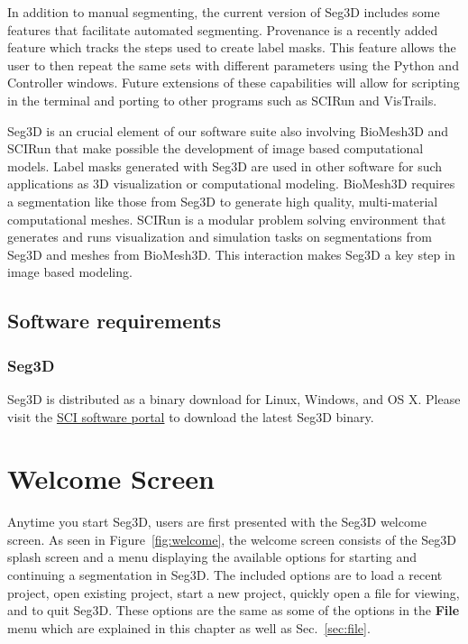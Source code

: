 \documentclass[fleqn,11pt,openany]{book}
\begin{document}
In addition to manual segmenting, the current version of Seg3D includes some features that facilitate automated segmenting.
Provenance is a recently added feature which tracks the steps used to create label masks.
This feature allows the user to then repeat the same sets with different parameters using the Python and Controller windows.
Future extensions of these capabilities will allow for scripting in the terminal and porting to other programs such as SCIRun and VisTrails.

Seg3D is an crucial element of our software suite also involving BioMesh3D and SCIRun that make possible the development of image based computational models.  Label masks generated with Seg3D are used in other software  for such applications as 3D visualization or computational modeling.
BioMesh3D requires a segmentation like those from Seg3D to generate high quality, multi-material computational meshes.
SCIRun is a modular problem solving environment that generates and runs visualization and simulation tasks on segmentations from Seg3D and meshes from BioMesh3D.
This interaction makes Seg3D a key step in image based modeling.

\section{Software requirements}

\subsection{Seg3D \SegthreeDVersion}

Seg3D is distributed as a binary download for Linux, Windows, and OS X. Please visit the \href{http://www.seg3d.org}{SCI software portal} to download the latest Seg3D binary. 



\chapter{Welcome Screen}
\label{sec:welcome}

\begin{introduction}
Anytime you start Seg3D, users are first presented with the Seg3D welcome screen.
As seen in Figure~\ref{fig:welcome}, the welcome screen consists of the Seg3D splash screen and a menu displaying the available options for starting and continuing a segmentation in Seg3D.
The included options are to load a recent project, open existing project, start a new project, quickly open a file for viewing, and to quit Seg3D.
These options are the same as some of the options in the \textbf{File} menu which are explained in this chapter as well as Sec.~\ref{sec:file}.
\end{introduction}
\end{document}

